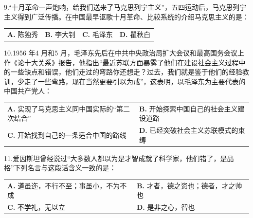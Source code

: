 \documentclass[UTF8,11pt]{ctexart}
\begin{document}
9.“十月革命一声炮响，给我们送来了马克思列宁主义”，五四运动后，马克思列宁主义得到广泛传播。在中国最早讴歌十月革命、比较系统的介绍马克思主义的是：


\begin{center}\begin{tabular}{>{\raggedright\arraybackslash}p{\dimexpr(\linewidth-8\tabcolsep)/4\relax}>{\raggedright\arraybackslash}p{\dimexpr(\linewidth-8\tabcolsep)/4\relax}>{\raggedright\arraybackslash}p{\dimexpr(\linewidth-8\tabcolsep)/4\relax}>{\raggedright\arraybackslash}p{\dimexpr(\linewidth-8\tabcolsep)/4\relax}}
\textbf{A.} 陈独秀 & \textbf{B.} 李大钊 & \textbf{C.} 毛泽东 & \textbf{D.} 瞿秋白\\[.35em]\end{tabular}\end{center}

10.1956 年4 月和5 月，毛泽东先后在中共中央政治局扩大会议和最高国务会议上作《论十大关系》报告，他指出“最近苏联方面暴露了他们在建设社会主义过程中的一些缺点和错误，他们走过的弯路你还想走？过去，我们就是鉴于他们的经验教训，少走了一些弯路，现在当然更要引以为戒”，这表明，以毛泽东为主要代表的中国共产党人：


\begin{center}\begin{tabular}{>{\raggedright\arraybackslash}p{\dimexpr(\linewidth-4\tabcolsep)/2\relax}>{\raggedright\arraybackslash}p{\dimexpr(\linewidth-4\tabcolsep)/2\relax}}
\textbf{A.} 实现了马克思主义同中国实际的“第二次结合” & \textbf{B.} 开始探索中国自己的社会主义建设道路\\[.35em]
\textbf{C.} 开始找到自己的一条适合中国的路线 & \textbf{D.} 已经突破社会主义苏联模式的束缚\\[.35em]\end{tabular}\end{center}

11.爱因斯坦曾经说过“大多数人都以为是才智成就了科学家，他们错了，是品格”下列名言与这段话含义一致的是：


\begin{center}\begin{tabular}{>{\raggedright\arraybackslash}p{\dimexpr(\linewidth-4\tabcolsep)/2\relax}>{\raggedright\arraybackslash}p{\dimexpr(\linewidth-4\tabcolsep)/2\relax}}
\textbf{A.} 道虽迩，不行不至；事虽小，不为不成 & \textbf{B.} 才者，德之资也；德者，才之帅也\\[.35em]
\textbf{C.} 不学礼，无以立 & \textbf{D.} 是非之心，智也\\[.35em]\end{tabular}\end{center}
\end{document}

